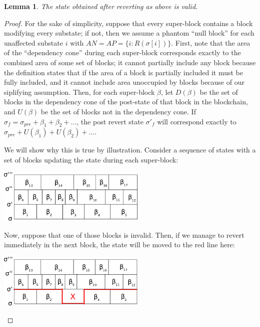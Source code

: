 \documentclass[11pt,a4paper]{report}
\theoremstyle{plain}
\newtheorem{lem}[thm]{Lemma}
\theoremstyle{definition}
\theoremstyle{remark}
\begin{document}
\begin{lem}
The state obtained after reverting as above is valid.
\end{lem}

\begin{proof}
For the sake of simplicity, suppose that every super-block contains a block modifying every substate; if not, then we assume a phantom ``null block'' for each unaffected substate $i$ with $AN = AP = \{i: R(\sigma[i])\}$. First, note that the area of the ``dependency cone'' during each super-block corresponds exactly to the combined area of some set of blocks; it cannot partially include any block because the definition states that if the area of a block is partially included it must be fully included, and it cannot include area unoccupied by blocks because of our siplifying assumption. Then, for each super-block $\beta$, let $D(\beta)$ be the set of blocks in the dependency cone of the post-state of that block in the blockchain, and $U(\beta)$ be the set of blocks not in the dependency cone. If $\sigma_f = \sigma_{pre} + \beta_1 + \beta_2 + ...$, the post revert state $\sigma'_f$ will correspond exactly to $\sigma_{pre} + U(\beta_1) + U(\beta_2) + ...$. 

We will show why this is true by illustration. Consider a sequence of states with a set of blocks updating the state during each super-block:

\begin{center}
\includegraphics[width=200pt]{revert1.png}
\end{center}

Now, suppose that one of those blocks is invalid. Then, if we manage to revert immediately in the next block, the state will be moved to the red line here:

\begin{center}
\includegraphics[width=200pt]{revert2.png}
\end{center}


\end{proof}
\end{document}
